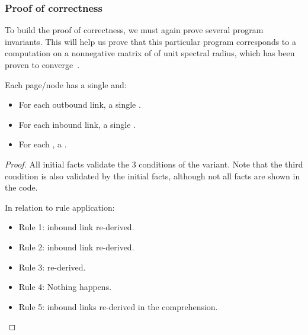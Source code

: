 \subsubsection{Proof of correctness}

To build the proof of correctness, we must again prove several program
invariants. This will help us prove that this particular program corresponds to
a computation on a nonnegative matrix of of unit spectral radius, which has been
proven to converge~\cite{DBLP:journals/corr/abs-cs-0606047,
Lubachevsky:1986:CAA:4904.4801}.

\begin{invariant}
Each page/node has a single  and:
\begin{itemize}
   \item For each outbound link, a single .
   \item For each inbound link, a single .
   \item For each , a
      .
\end{itemize}
\end{invariant}

\begin{proof}

All initial facts validate the 3 conditions of the variant. Note that the third
condition is also validated by the initial facts, although not all facts are shown in
the code.

In relation to rule application:

\begin{itemize}
   \item Rule 1: inbound link re-derived.
   \item Rule 2: inbound link re-derived.
   \item Rule 3:  re-derived.
   \item Rule 4: Nothing happens.
   \item Rule 5: inbound links re-derived in the comprehension.
\end{itemize}
\end{proof}

